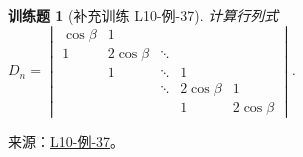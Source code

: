 \documentclass[12pt,fontset=fandol]{ctexart}
\newtheorem{exercise}{训练题}[section]
\begin{document}
\begin{exercise}[补充训练 L10-例-37]\label{prob:L10-例-37}
计算行列式$D_n=\begin{vmatrix}
            \cos \beta & 1            &        &              &              \\
            1          & 2 \cos \beta & \ddots &              &              \\
                       & 1            & \ddots & 1            &              \\
                       &              & \ddots & 2 \cos \beta & 1            \\
                       &              &        & 1            & 2 \cos \beta
        \end{vmatrix}$.
\end{exercise}
\noindent 来源：\href{https://github.com/yhwu-is/Linear-Algebra-Left-Undone/blob/new/%E8%AE%B2%E4%B9%89/%E4%B8%93%E9%A2%98/10%20%E8%A1%8C%E5%88%97%E5%BC%8F.tex}{L10-例-37}。
\end{document}
